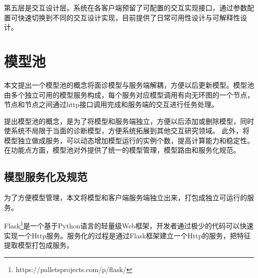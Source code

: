 第五层是交互设计层。系统在各客户端预留了可配置的交互实现接口，通过参数配置可快速切换到不同的交互设计实现，目前提供了日常可用性设计与可解释性设计。


%

\section{模型池}
\label{sec:model_pool}
本文提出一个模型池的概念将面诊模型与服务端解耦，方便以后更新模型。模型池由多个独立可用的模型服务构成，每个服务对应模型调用有向无环图的一个节点，节点和节点之间通过http接口调用完成和服务端的交互进行任务处理。

提出模型池的概念，是为了将模型和服务端独立，方便以后添加或删除模型，同时使系统不局限于当面的诊断模型，方便系统拓展到其他交互研究领域。
此外，将模型独立做成服务，可以动态增加模型运行的实例个数，提高计算能力和稳定性。
在功能点方面，模型池对外提供了统一的模型管理，模型路由和服务化规范。

\subsection{模型服务化及规范}
为了方便模型管理，本文将模型和客户端服务端独立出来，打包成独立可运行的服务。

Flask\footnote{https://palletsprojects.com/p/flask/}是一个基于Python语言的轻量级Web框架，开发者通过极少的代码可以快速实现一个Http服务。服务化的过程是通过Flask框架建立一个Http的服务，把特征提取模型打包成服务。

